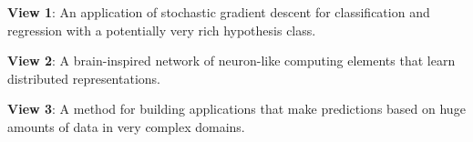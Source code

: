 \documentclass[10pt,oneside]{book}
\begin{document}
\pagestyle{empty}
\thispagestyle{empty}

\begin{description}
\item{\bf View 1}: An application of stochastic gradient descent for
  classification and regression with a potentially very rich
  hypothesis class. 
\item{\bf View 2}: A brain-inspired network of neuron-like computing
elements that learn distributed representations. 
\item{\bf View 3}: A method for building applications that make
predictions based on huge amounts of data in very complex domains.
\end{description}
\end{document}
